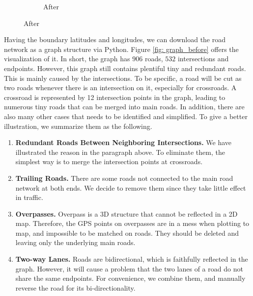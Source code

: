 \begin{figure}[htb]
\begin{subfigure}[t]{0.45\linewidth}
      \caption{After}
      \label{fig: graph_after}
  \end{subfigure}
\end{figure}
Having the boundary latitudes and longitudes, we can download the road network as a graph structure via Python. Figure \ref{fig: graph_before} offers the visualization of it. In short, the graph has $906$ roads, $532$ intersections and endpoints. However, this graph still contains plentiful tiny and redundant roads. This is mainly caused by the intersections\cite{graph_simplify}. To be specific, a road will be cut as two roads whenever there is an intersection on it, especially for crossroads. A crossroad is represented by 12 intersection points in the graph, leading to numerous tiny roads that can be merged into main roads. In addition, there are also many other cases that needs to be identified and simplified. To give a better illustration, we summarize them as the following.

\begin{enumerate}
  \item \textbf{Redundant Roads Between Neighboring Intersections.} We have illustrated the reason in the paragraph above. To eliminate them, the simplest way is to merge the intersection points at crossroads.
  \item \textbf{Trailing Roads.} There are some roads not connected to the main road network at both ends. We decide to remove them since they take little effect in traffic.
  \item \textbf{Overpasses.} Overpass is a 3D structure that cannot be reflected in a 2D map. Therefore, the GPS points on overpasses are in a mess when plotting to map, and impossible to be matched on roads. They should be deleted and leaving only the underlying main roads.
  \item \textbf{Two-way Lanes.} Roads are bidirectional, which is faithfully reflected in the graph. However, it will cause a problem that the two lanes of a road do not share the same endpoints. For convenience, we combine them, and manually reverse the road for its bi-directionality.
\end{enumerate}


